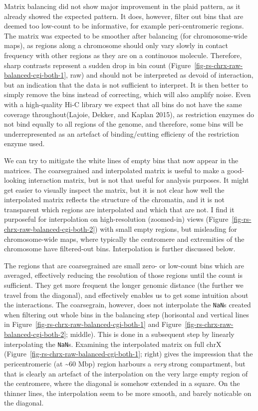 \documentclass[
  11pt,
  a4paper,
]{scrbook}
\begin{document}
Matrix balancing did not show major improvement in the plaid pattern, as
it already showed the expected pattern. It does, however, filter out
bins that are deemed too low-count to be informative, for example
peri-centromeric regions. The matrix was expected to be smoother after
balancing (for chromosome-wide maps), as regions along a chromosome
should only vary slowly in contact frequency with other regions as they
are on a continouos molecule. Therefore, sharp contrasts represent a
sudden drop in bin count
(Figure~\ref{fig-rs-chrx-raw-balanced-cgi-both-1}, raw) and should not
be interpreted as devoid of interaction, but an indication that the data
is not sufficient to interpret. It is then better to simply remove the
bins instead of correcting, which will also amplify noise. Even with a
high-quality Hi-C library we expect that all bins do not have the same
coverage throughout(Lajoie, Dekker, and Kaplan 2015), as restriction
enzymes do not bind equally to all regions of the genome, and therefore,
some bins will be underrepresented as an artefact of binding/cutting
efficieny of the restriction enzyme used.

We can try to mitigate the white lines of empty bins that now appear in
the matrices. The coarsegrained and interpolated matrix is useful to
make a good-looking interaction matrix, but is not that useful for
analysis purposes. It might get easier to visually inspect the matrix,
but it is not clear how well the interpolated matrix reflects the
structure of the chromatin, and it is not transparent which regions are
interpolated and which that are not. I find it purposeful for
interpolation on high-resolution (zoomed-in) views
(Figure~\ref{fig-rs-chrx-raw-balanced-cgi-both-2}) with small empty
regions, but misleading for chromosome-wide maps, where typically the
centromere and extremities of the chromosome have filtered-out bins.
Interpolation is further discussed below.

The regions that are coarsegrained are small zero- or low-count bins
which are averaged, effectively reducing the resolution of those regions
until the count is sufficient. They get more frequent the longer genomic
distance (the further we travel from the diagonal), and effectively
enables us to get some intuition about the interactions. The
coarsegrain, however, does not interpolate the \texttt{NaN}s created
when filtering out whole bins in the balancing step (horisontal and
vertical lines in Figure~\ref{fig-rs-chrx-raw-balanced-cgi-both-1} and
Figure~\ref{fig-rs-chrx-raw-balanced-cgi-both-2}; middle). This is done
in a subsequent step by linearly interpolating the \texttt{NaN}s.
Examining the interpolated matrix on full chrX
(Figure~\ref{fig-rs-chrx-raw-balanced-cgi-both-1}; right) gives the
impression that the pericentromeric (at \textasciitilde60 Mbp) region
harbours a \emph{very} strong compartment, but that is clearly an
artefact of the interpolation on the very large empty region of the
centromere, where the diagonal is somehow extended in a square. On the
thinner lines, the interpolation seem to be more smooth, and barely
noticable on the diagonal.
\end{document}
